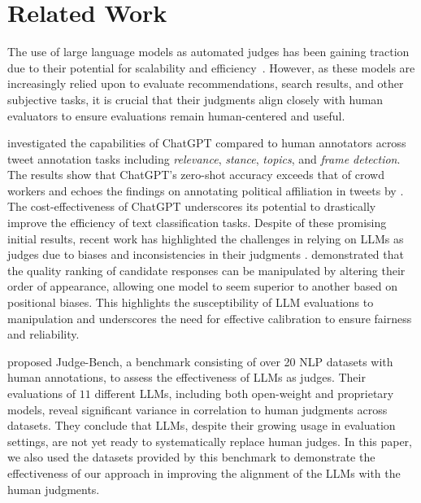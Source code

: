 \section{Related Work}
\label{sec:literature_review}
The use of large language models as automated judges has been gaining traction due to their potential for scalability and efficiency~\cite{zheng2023judging, bavaresco2024llms}. However, as these models are increasingly relied upon to evaluate recommendations, search results, and other subjective tasks, it is crucial that their judgments align closely with human evaluators to ensure evaluations remain human-centered and useful.

\citet{gilardi2023chatgpt} investigated the capabilities of ChatGPT compared to human annotators across tweet annotation tasks including \textit{relevance}, \textit{stance}, \textit{topics}, and \textit{frame detection}. The results show that ChatGPT's zero-shot accuracy exceeds that of crowd workers and echoes the findings on annotating political affiliation in tweets by \citet{tornberg2023chatgpt}.
%
The cost-effectiveness of ChatGPT underscores its potential to drastically improve the efficiency of text classification tasks. 
%
Despite of these promising initial results, recent work has highlighted the challenges in relying on LLMs as judges due to biases and inconsistencies in their judgments \citep{wu2023style,zheng2023large,koo2024benchmarking,hada2024large,pavlovic2024effectiveness}. \citet{wang2023large} demonstrated that the quality ranking of candidate responses can be manipulated by altering their order of appearance, allowing one model to seem superior to another based on positional biases. This highlights the susceptibility of LLM evaluations to manipulation and underscores the need for effective calibration to ensure fairness and reliability.

\citet{bavaresco2024llms} proposed Judge-Bench, a benchmark consisting of over 20 NLP datasets with human annotations, to assess the effectiveness of LLMs as judges. Their evaluations of $11$ different LLMs, including both open-weight and proprietary models, reveal significant variance in correlation to human judgments across datasets. They conclude that LLMs, despite their growing usage in evaluation settings, are not yet ready to systematically replace human judges.
%
In this paper, we also used the datasets provided by this benchmark to demonstrate the effectiveness of our approach in improving the alignment of the LLMs with the human judgments. 

